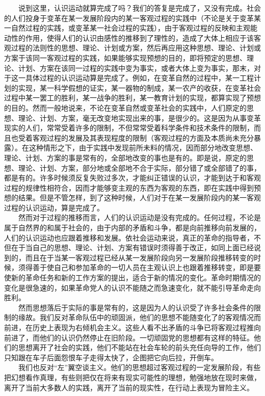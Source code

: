 \documentclass[cn,11pt,chinese]{elegantbook}
\begin{document}
　　说到这里，认识运动就算完成了吗？我们的答复是完成了，又没有完成。社会的人们投身于变革在某一发展阶段内的某一客观过程的实践中（不论是关于变革某一自然过程的实践，或变革某一社会过程的实践），由于客观过程的反映和主观能动性的作用，使得人们的认识由感性的推移到了理性的，造成了大体上相应于该客观过程的法则性的思想、理论、计划或方案，然后再应用这种思想、理论、计划或方案于该同一客观过程的实践，如果能够实现预想的目的，即将预定的思想、理论、计划、方案在该同一过程的实践中变为事实，或者大体上变为事实，那末，对于这一具体过程的认识运动算是完成了。例如，在变革自然的过程中，某一工程计划的实现，某一科学假想的证实，某一器物的制成，某一农产的收获，在变革社会过程中某一罢工的胜利，某一战争的胜利，某一教育计划的实现，都算实现了预想的目的。然而一般地说来，不论在变革自然或变革社会的实践中，人们原定的思想、理论、计划、方案，毫无改变地实现出来的事，是很少的。这是因为从事变革现实的人们，常常受着许多的限制，不但常常受着科学条件和技术条件的限制，而且也受着客观过程的发展及其表现程度的限制（客观过程的方面及本质尚未充分暴露）。在这种情形之下，由于实践中发现前所未料的情况，因而部分地改变思想、理论、计划、方案的事是常有的，全部地改变的事也是有的。即是说，原定的思想、理论、计划、方案，部分地或全部地不合于实际，部分错了或全部错了的事，都是有的。许多时候须反复失败过多次，才能纠正错误的认识，才能到达于和客观过程的规律性相符合，因而才能够变主观的东西为客观的东西，即在实践中得到预想的结果。但是不管怎样，到了这种时候，人们对于在某一发展阶段内的某一客观过程的认识运动，算是完成了。\\
　　然而对于过程的推移而言，人们的认识运动是没有完成的。任何过程，不论是属于自然界的和属于社会的，由于内部的矛盾和斗争，都是向前推移向前发展的，人们的认识运动也应跟着推移和发展。依社会运动来说，真正的革命的指导者，不但在于当自己的思想、理论、计划、方案有错误时须得善于改正，如同上面已经说到的，而且在于当某一客观过程已经从某一发展阶段向另一发展阶段推移转变的时候，须得善于使自己和参加革命的一切人员在主观认识上也跟着推移转变，即是要使新的革命任务和新的工作方案的提出，适合于新的情况的变化。革命时期情况的变化是很急速的，如果革命党人的认识不能随之而急速变化，就不能引导革命走向胜利。\\
　　然而思想落后于实际的事是常有的，这是因为人的认识受了许多社会条件的限制的缘故。我们反对革命队伍中的顽固派，他们的思想不能随变化了的客观情况而前进，在历史上表现为右倾机会主义。这些人看不出矛盾的斗争已将客观过程推向前进了，而他们的认识仍然停止在旧阶段。一切顽固党的思想都有这样的特征。他们的思想离开了社会的实践，他们不能站在社会车轮的前头充任向导的工作，他们只知跟在车子后面怨恨车子走得太快了，企图把它向后拉，开倒车。\\
　　我们也反对“左”翼空谈主义。他们的思想超过客观过程的一定发展阶段，有些把幻想看作真理，有些则把仅在将来有现实可能性的理想，勉强地放在现时来做，离开了当前大多数人的实践，离开了当前的现实性，在行动上表现为冒险主义。\\
\end{document}
